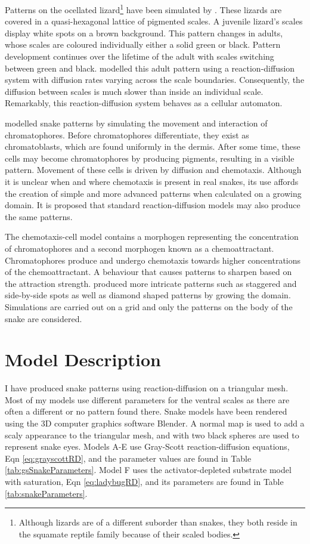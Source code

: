 Patterns on the ocellated lizard\footnote{Although lizards are of a different suborder than snakes, they both reside in the squamate reptile family because of their scaled bodies.} have been simulated by \citet{manukyan2017}. These lizards are covered in a quasi-hexagonal lattice of pigmented scales. A juvenile lizard's scales display white spots on a brown background. This pattern changes in adults, whose scales are coloured individually either a solid green or black. Pattern development continues over the lifetime of the adult with scales switching between green and black. \citet{manukyan2017} modelled this adult pattern using a reaction-diffusion system with diffusion rates varying across the scale boundaries. Consequently, the diffusion between scales is much slower than inside an individual scale. Remarkably, this reaction-diffusion system behaves as a cellular automaton.

\citet{MURRAY1991} modelled snake patterns by simulating the movement and interaction of chromatophores. Before chromatophores differentiate, they exist as chromatoblasts, which are found uniformly in the dermis. After some time, these cells may become chromatophores by producing pigments, resulting in a visible pattern. Movement of these cells is driven by diffusion and chemotaxis. Although it is unclear when and where chemotaxis is present in real snakes, its use affords the creation of simple and more advanced patterns when calculated on a growing domain. It is proposed that standard reaction-diffusion models may also produce the same patterns.

The chemotaxis-cell model contains a morphogen representing the concentration of chromatophores and a second morphogen known as a chemoattractant. Chromatophores produce and undergo chemotaxis towards higher concentrations of the chemoattractant. A behaviour that causes patterns to sharpen based on the attraction strength. \citet{MURRAY1991} produced more intricate patterns such as staggered and side-by-side spots as well as diamond shaped patterns by growing the domain. Simulations are carried out on a grid and only the patterns on the body of the snake are considered.

\section{Model Description}
I have produced snake patterns using reaction-diffusion on a triangular mesh. Most of my models use different parameters for the ventral scales as there are often a different or no pattern found there. Snake models have been rendered using the 3D computer graphics software Blender. A normal map is used to add a scaly appearance to the triangular mesh, and with two black spheres are used to represent snake eyes. Models A-E use Gray-Scott reaction-diffusion equations, Eqn \ref{eq:grayscottRD}, and the parameter values are found in Table \ref{tab:gsSnakeParameters}. Model F uses the activator-depleted substrate model with saturation, Eqn \ref{eq:ladybugRD}, and its parameters are found in Table \ref{tab:snakeParameters}.

